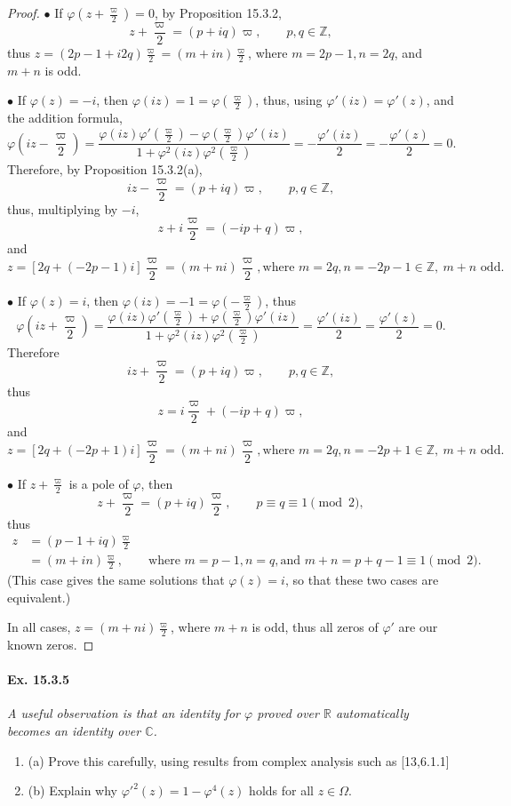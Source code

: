 \documentclass[11pt,a4paper]{article}
\newcommand{\be} {\begin{enumerate}}
\newcommand{\ee} {\end{enumerate}}
\newcommand{\Z}{\mathbb{Z}}
\newcommand{\R}{\mathbb{R}}
\newcommand{\C}{\mathbb{C}}
\begin{document}
\begin{proof}
$\bullet$ If $\varphi \left(z + \frac{\varpi}{2} \right) = 0$, by Proposition 15.3.2,
$$z + \frac{\varpi}{2}  = (p+iq)\varpi,\qquad p,q\in \Z,$$
thus $z = (2p-1 + i 2q)\frac{\varpi}{2} = (m +in)\frac{\varpi}{2}$, where $m = 2p-1, n = 2q$, and $m+n$ is odd.

$\bullet$ If $\varphi(z) = -i$, then $\varphi(iz) = 1  = \varphi\left(\frac{\varpi}{2}\right) $, thus, using $\varphi'(iz) = \varphi'(z)$, and the addition formula,
$$\varphi\left( iz - \frac{\varpi}{2} \right)= \frac{\varphi(iz) \varphi'\left(\frac{\varpi}{2}\right) - \varphi\left(\frac{\varpi}{2}\right) \varphi'(iz)}{1 + \varphi^2(iz) \varphi^2\left(\frac{\varpi}{2}\right)} = -\frac{\varphi'(iz)}{2} = - \frac{\varphi'(z)}{2} = 0.$$
Therefore, by Proposition 15.3.2(a),
$$iz - \frac{\varpi}{2}  = (p+iq)\varpi,\qquad p,q\in \Z,$$
thus, multiplying by $-i$,
$$ z + i \frac{\varpi}{2}  = (-ip +q) \varpi,$$
and
$$z = \left[2q + (-2p-1)i\right] \frac{\varpi}{2}  = (m+ni)  \frac{\varpi}{2}, \text{where } m = 2q,n=-2p-1 \in \Z,\ m+n \text{ odd}.$$

$\bullet$ If $\varphi(z) = i$, then $\varphi(iz) = -1 =\varphi\left(-\frac{\varpi}{2}\right)$, thus
$$\varphi\left( iz + \frac{\varpi}{2} \right)= \frac{\varphi(iz) \varphi'\left(\frac{\varpi}{2}\right) +\varphi\left(\frac{\varpi}{2}\right) \varphi'(iz)}{1 + \varphi^2(iz) \varphi^2\left(\frac{\varpi}{2}\right)} = \frac{\varphi'(iz)}{2} =  \frac{\varphi'(z)}{2} = 0.$$
Therefore
$$ iz + \frac{\varpi}{2} = (p+iq)\varpi,\qquad p,q\in \Z,$$
thus
$$z = i\frac{\varpi}{2} +(-ip +q)\varpi,$$
and
$$z = \left[2q + (-2p+1)i\right] \frac{\varpi}{2}  = (m+ni)  \frac{\varpi}{2}, \text{where } m = 2q,n=-2p+1 \in \Z,\ m+n \text{ odd}.$$

$\bullet$ If $z + \frac{\varpi}{2}$ is a pole of $\varphi$, then
$$z + \frac{\varpi}{2} = (p + iq) \frac{\varpi}{2}, \qquad p\equiv q \equiv 1 \pmod 2,$$
thus
\begin{align*}
z&=(p-1 + i q)\frac{\varpi}{2}\\
&= (m + in) \frac{\varpi}{2},\qquad \text{where } m = p-1,n=q,\text {and } m+n = p+q-1 \equiv 1 \pmod 2.
\end{align*}
(This case gives the same solutions that $\varphi(z) = i$, so that these two cases are equivalent.)

In all cases, $z = (m+ni)  \frac{\varpi}{2}$, where $m+n$ is odd, thus all zeros of $\varphi'$ are our known zeros.
\end{proof}


\paragraph{Ex. 15.3.5}{\it A useful observation is that an identity for $\varphi$ proved over $\R$ automatically becomes an identity over $\C$.
\be
\item[(a)] Prove this carefully, using results from complex analysis such as [13,6.1.1]
\item[(b)] Explain why $\varphi'^2(z) = 1 - \varphi^4(z)$ holds for all $z \in \Omega$.
\ee
}
\end{document}
